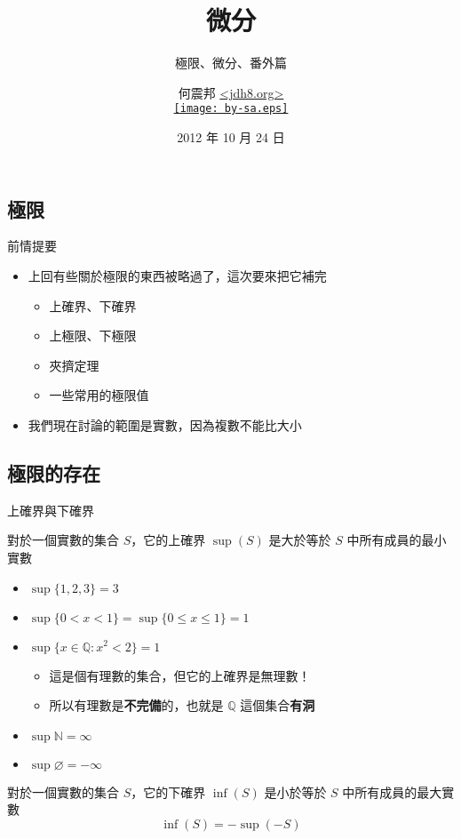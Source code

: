 \documentclass{beamer}
\begin{document}
\begin{CJK}{UTF8}{bsmi}
\title{微分}
\subtitle{極限、微分、番外篇}
\author[何震邦]{何震邦 \href{http://jdh8.org/}{\textless jdh8.org\textgreater}\\
    \href{http://creativecommons.org/licenses/by-sa/3.0/tw/deed.zh\textunderscore TW}{\texttt{[image: by-sa.eps]}}}
\date{2012 年 10 月 24 日}
\maketitle

\section{極限}
\begin{frame}{前情提要}
  \begin{itemize}
    \item 上回有些關於極限的東西被略過了，這次要來把它補完
      \begin{itemize}
      \item 上確界、下確界
      \item 上極限、下極限
      \item 夾擠定理
      \item 一些常用的極限值
      \end{itemize}
    \item 我們現在討論的範圍是實數，因為複數不能比大小
  \end{itemize}
\end{frame}

\subsection{極限的存在}
\begin{frame}{上確界與下確界}
  \begin{definition}
    對於一個實數的集合 $S$，它的上確界 $\sup(S)$ 是大於等於 $S$ 中所有成員的最小實數
  \end{definition}
  \begin{itemize}
    \item $\sup\{1,2,3\} = 3$
    \item $\sup\{0 < x < 1\} = \sup\{0 \le x \le 1\} = 1$
    \item $\sup\{x\in\mathbb{Q}: x^2 < 2\} = 1$
      \begin{itemize}
      \item 這是個有理數的集合，但它的上確界是無理數！
      \item 所以有理數是\textbf{不完備}的，也就是 $\mathbb{Q}$ 這個集合\textbf{有洞}
      \end{itemize}
    \item $\sup\mathbb{N} = \infty$
    \item $\sup\varnothing = -\infty$
  \end{itemize}
  \begin{definition}
    對於一個實數的集合 $S$，它的下確界 $\inf(S)$ 是小於等於 $S$ 中所有成員的最大實數
    \[\inf(S) = -\sup(-S)\]
  \end{definition}
\end{frame}


\end{CJK}
\end{document}
